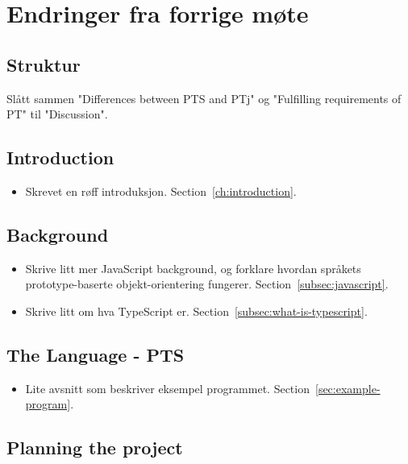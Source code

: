 
\chapter*{Endringer fra forrige møte}

\section*{Struktur}

Slått sammen "Differences between PTS and PTj" og "Fulfilling requirements of PT" til "Discussion".

\section*{Introduction}

\begin{itemize}
    \item Skrevet en røff introduksjon.
    Section~\vref{ch:introduction}.
\end{itemize}

\section*{Background}

\begin{itemize}
    \item Skrive litt mer JavaScript background, og forklare hvordan språkets prototype-baserte objekt-orientering fungerer.
    Section~\vref{subsec:javascript}.
    \item Skrive litt om hva TypeScript er.
    Section~\vref{subsec:what-is-typescript}.
\end{itemize}

\section*{The Language - PTS}

\begin{itemize}
    \item Lite avsnitt som beskriver eksempel programmet.
    Section~\vref{sec:example-program}.
\end{itemize}

\section*{Planning the project}

